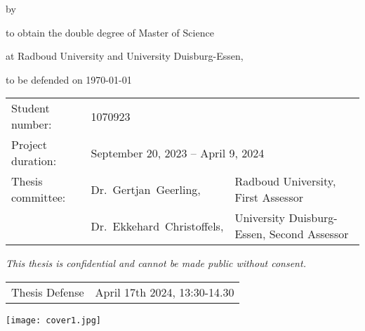 \begin{titlepage}

\begin{center}

{\makeatletter
\largetitlestyle\fontsize{40}{40}\selectfont\@title
\makeatother}

{\makeatletter
\ifdefvoid{\@subtitle}{}{\bigskip\titlestyle\fontsize{20}{20}\selectfont\@subtitle}
\makeatother}

\bigskip
\bigskip

by

\bigskip
\bigskip

{\makeatletter
\largetitlestyle\fontsize{20}{20}\selectfont\@author
\makeatother}

\bigskip
\bigskip

to obtain the double degree of Master of Science

at Radboud University and University Duisburg-Essen,

to be defended on {\today}

\vfill

\begin{tabular}{lll}
    Student number: & 1070923 \\
    Project duration: & \multicolumn{2}{l}{September 20, 2023 -- April 9, 2024} \\
    Thesis committee: & Dr.\ Gertjan\ Geerling, & Radboud University, First Assessor \\
        & Dr.\ Ekkehard\ Christoffels, & University Duisburg-Essen, Second Assessor \\
   
\end{tabular}

\bigskip
\bigskip
\emph{This thesis is confidential and cannot be made public without consent.}

\bigskip
\bigskip
\begin{tabular}{p{15mm}p{10cm}}
    Thesis Defense&  April 17th 2024, 13:30-14.30\\
\end{tabular}

\bigskip
\bigskip


\end{center}

\texttt{[image: cover1.jpg]}

\end{titlepage}
